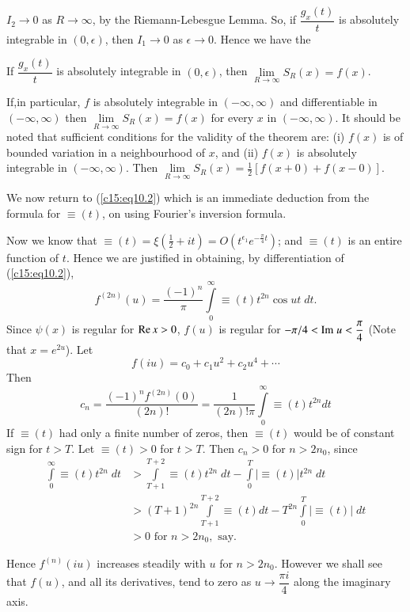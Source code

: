 $I_2 \to 0$ as $R \to \infty$, by the Riemann-Lebesgue Lemma. So, if
\; $\dfrac{g_x(t)}{t}$ is absolutely integrable in $(0,\epsilon)$,
then $I_1 \to 0$ as $\epsilon \to 0$. Hence we have the 

\begin{theorem*}\cite[p.10]{key5}
If \; $\dfrac{g_x(t)}{t}$ is absolutely integrable in
$(0,\epsilon)$, then $\lim\limits_{R\to\infty} S_R (x) = f(x)$.
\end{theorem*}

If,\pageoriginale in particular, $f$ is absolutely integrable in
$(-\infty, \infty)$ and differentiable in $(-\infty, \infty)$ then
$\lim\limits_{R\to\infty} S_R(x) = f(x)$ for every $x$ in $(-\infty,
\infty)$. It should be noted that sufficient conditions for the
validity of the theorem are: (i) $f(x)$ is of bounded variation in a
neighbourhood of $x$, and (ii) $f(x)$ is absolutely integrable in
$(-\infty, \infty)$. Then $\lim\limits_{R\to \infty} S_R(x)
=\frac{1}{2} [f(x+0) + f(x-0)]$.

We now return to (\ref{c15:eq10.2}) which is an immediate deduction from the
formula for $\equiv (t)$, on using Fourier's inversion formula.

Now we know that $\equiv(t) = \xi(\frac{1}{2}  + it) = O
(t^{\epsilon_1} e^{-\frac{\pi}{4}t})$; and $\equiv (t)$ is an
entire function of $t$. Hence we are justified in obtaining, by
differentiation of (\ref{c15:eq10.2}),
$$
f^{(2n)} (u) = \frac{(-1)^{n}}{\pi} \int\limits^\infty_0 \equiv (t)
t^{2n} \cos ut\; dt.
$$
Since $\psi(x)$ is regular for $\operatorname{Re} x >0$, $f(u)$ is regular for
$-\pi/4 < {\rm Im} \; u  < \dfrac{\pi}{4}$ (Note that $x=e^{2u}$). Let 
$$
f(iu) = c_0 + c_1 u^2 + c_2 u^4 + \cdots
$$
Then 
$$
c_n = \frac{(-1)^n f^{(2n)}(0)}{(2n)!} = \frac{1}{(2n)!\pi}
\int\limits^\infty_0 \equiv (t) t^{2n} dt
$$
If $\equiv (t)$ had only a finite number of zeros, then $\equiv (t)$
would be of constant sign for $t > T$. Let $\equiv (t) > 0$ for
$t>T$. Then $c_n >0$ for $n>2n_0$, since
\begin{align*}
\int\limits^\infty_0 \equiv (t) t^{2n} \; dt & > \int\limits^{T+2}_{T+1}
\equiv (t) t^{2n} \; dt - \int\limits^T_0 |\equiv (t)| t^{2n} \; dt\\
& > (T+1)^{2n} \int\limits^{T+2}_{T+1} \equiv (t) dt - T^{2n}
\int\limits^T_0 |\equiv (t)| \; dt\\
& > 0 \text{ for } n > 2n_0 , \text{ say}.
\end{align*}\pageoriginale

Hence $f^{(n)}(iu)$ increases steadily with $u$ for $n>2n_0$. However
we shall see that $f(u)$, and all its derivatives, tend to zero as $u
\to \dfrac{\pi i}{4}$ along the imaginary axis.

